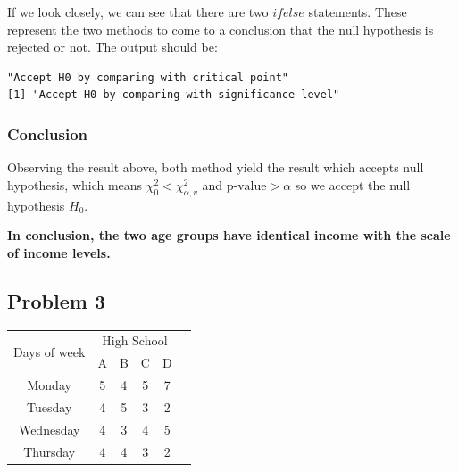 \documentclass[a4paper]{article}
\numberwithin{equation}{section}
\begin{document}
If we look closely, we can see that there are two \(ifelse\) statements. These represent the two methods to come to a conclusion that the null hypothesis is rejected or not. The output should be:
\begin{mdframed}[leftline=false,rightline=false,backgroundcolor=magenta!10,nobreak=true]
  \begin{verbatim}
"Accept H0 by comparing with critical point"
[1] "Accept H0 by comparing with significance level"
  \end{verbatim}
\end{mdframed}

\subsubsection{Conclusion}
Observing the result above, both method yield the result which accepts null hypothesis, which means \(\chi_0^2 < \chi_{\alpha, v}^2\) and \(\text{p-value} > \alpha \) so we accept the null hypothesis \(H_0\).

\textbf{In conclusion, the two age groups have identical income with the scale of income levels.}

\newpage
\subsection{Problem 3}

\begin{center}
  \begin{tabular}{cccccc}
    \toprule
    \multirow{2}{*}{Days of week} & \multicolumn{4}{c}{High School}             \\
    \cmidrule(lr){2-5}
                                  & A                               & B & C & D \\
    \midrule
    Monday                        & 5                               & 4 & 5 & 7 \\
    Tuesday                       & 4                               & 5 & 3 & 2 \\
    Wednesday                     & 4                               & 3 & 4 & 5 \\
    Thursday                      & 4                               & 4 & 3 & 2 \\
    \bottomrule
  \end{tabular}
\end{center}
\end{document}
